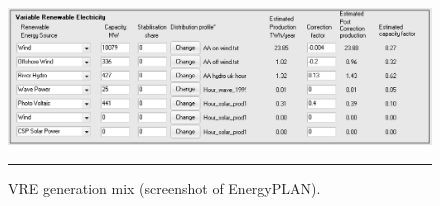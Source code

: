 \begin{figure}[htbp]
	\centering
	\includegraphics[width=\textwidth]{figures/B02_VRE.png}
	\rule{\textwidth}{0.5pt} %
	\caption{VRE generation mix (screenshot of EnergyPLAN).}
	\label{fig:B02-VRE}
\end{figure}